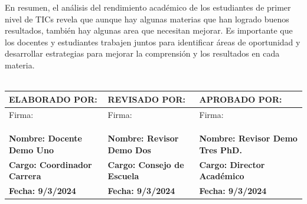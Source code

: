 En resumen, el análisis del rendimiento académico de los estudiantes de primer nivel de TICs revela que aunque hay algunas materias que han logrado buenos resultados, también hay algunas area que necesitan mejorar. Es importante que los docentes y estudiantes trabajen juntos para identificar áreas de oportunidad y desarrollar estrategias para mejorar la comprensión y los resultados en cada materia.\\
\vspace{1cm}\\\begin{tabularx}{\textwidth}{|X|X|X|}
    \hline
    \textbf{ELABORADO POR:} & \textbf{REVISADO POR:} & \textbf{APROBADO POR:} \\ \hline
    Firma: & Firma: & Firma:\\
    &&\\
    &&\\
    &&\\ \hline
    \textbf{Nombre: Docente Demo Uno} & \textbf{Nombre: Revisor Demo Dos} & \textbf{Nombre: Revisor Demo Tres PhD.} \\ \hline
    \textbf{Cargo: Coordinador Carrera} & \textbf{Cargo: Consejo de Escuela} & \textbf{Cargo: Director Académico} \\ \hline
    \textbf{Fecha: 9/3/2024} & \textbf{Fecha: 9/3/2024} & \textbf{Fecha: 9/3/2024} \\ \hline
    \end{tabularx}
